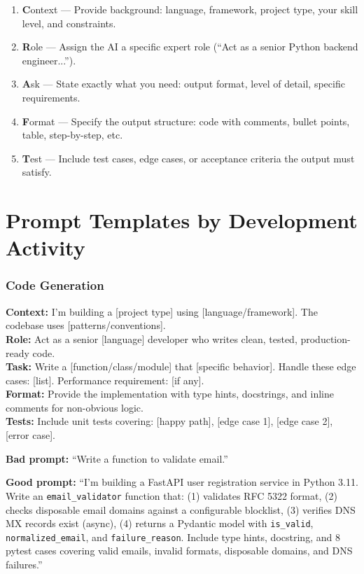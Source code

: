 \documentclass[11pt, a4paper, oneside]{report}
\begin{document}
\begin{enumerate}[leftmargin=*]
\item \textbf{C}ontext --- Provide background: language, framework, project type, your skill level, and constraints.
\item \textbf{R}ole --- Assign the AI a specific expert role (``Act as a senior Python backend engineer...'').
\item \textbf{A}sk --- State exactly what you need: output format, level of detail, specific requirements.
\item \textbf{F}ormat --- Specify the output structure: code with comments, bullet points, table, step-by-step, etc.
\item \textbf{T}est --- Include test cases, edge cases, or acceptance criteria the output must satisfy.
\end{enumerate}

\section[Prompt Templates]{Prompt Templates by Development Activity}

\subsubsection{Code Generation}

\begin{promptbox}[title={Template: Code Generation}]
\textbf{Context:} I'm building a [project type] using [language/framework]. The codebase uses [patterns/conventions].\\[4pt]
\textbf{Role:} Act as a senior [language] developer who writes clean, tested, production-ready code.\\[4pt]
\textbf{Task:} Write a [function/class/module] that [specific behavior]. Handle these edge cases: [list]. Performance requirement: [if any].\\[4pt]
\textbf{Format:} Provide the implementation with type hints, docstrings, and inline comments for non-obvious logic.\\[4pt]
\textbf{Tests:} Include unit tests covering: [happy path], [edge case 1], [edge case 2], [error case].
\end{promptbox}

\textbf{Bad prompt:} ``Write a function to validate email.''

\textbf{Good prompt:} ``I'm building a FastAPI user registration service in Python 3.11. Write an \texttt{email\_validator} function that: (1) validates RFC 5322 format, (2) checks disposable email domains against a configurable blocklist, (3) verifies DNS MX records exist (async), (4) returns a Pydantic model with \texttt{is\_valid}, \texttt{normalized\_email}, and \texttt{failure\_reason}. Include type hints, docstring, and 8 pytest cases covering valid emails, invalid formats, disposable domains, and DNS failures.''
\end{document}
